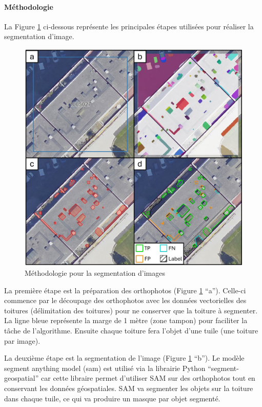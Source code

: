 \paragraph{Méthodologie}
La Figure \ref{fig:stdl_08_methodo_segmentation_images} ci-dessous représente les principales étapes utilisées pour réaliser la segmentation d'image.
\begin{figure}[H]
    \centering
    \includegraphics[width=1\linewidth]{02-main//figures/ch2/stdl_08_methodo_segmentation_images.png}
    \caption{Méthodologie pour la segmentation d’images \cite{herny_detection_2024}}
    \label{fig:stdl_08_methodo_segmentation_images}
\end{figure}

\par{La première étape est la préparation des orthophotos (Figure \ref{fig:stdl_08_methodo_segmentation_images} ``a''). Celle-ci commence par le découpage des orthophotos avec les données vectorielles des toitures (délimitation des toitures) pour ne conserver que la toiture à segmenter. La ligne bleue représente la marge de 1 mètre (zone tampon) pour faciliter la tâche de l'algorithme. Ensuite chaque toiture fera l'objet d'une tuile (une toiture par image).}

\par{La deuxième étape est la segmentation de l'image (Figure \ref{fig:stdl_08_methodo_segmentation_images} ``b''). Le modèle segment anything model (\acrshort{sam}) est utilisé via la librairie Python ``segment-geospatial'' \cite{wu_samgeo_2023} car cette libraire permet d'utiliser SAM sur des orthophotos tout en conservant les données géospatiales. SAM va segmenter les objets sur la toiture dans chaque tuile, ce qui va produire un masque par objet segmenté.}

